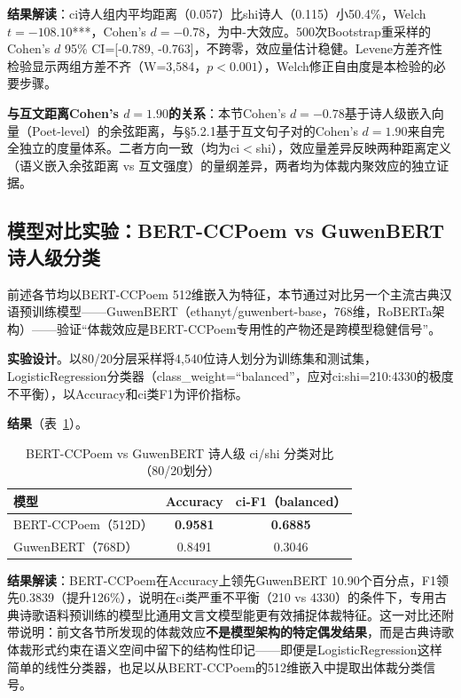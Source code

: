 \documentclass[12pt,a4paper]{article}
\numberwithin{equation}{section}
\begin{document}
\textbf{结果解读}：ci诗人组内平均距离（0.057）比shi诗人（0.115）小50.4\%，Welch $t=-108.10$***，Cohen's $d=-0.78$，为中-大效应。500次Bootstrap重采样的Cohen's $d$ 95\% CI=[-0.789, -0.763]，不跨零，效应量估计稳健。Levene方差齐性检验显示两组方差不齐（W=3{,}584，$p<0.001$），Welch修正自由度是本检验的必要步骤。

\textbf{与互文距离Cohen's $d=1.90$的关系}：本节Cohen's $d=-0.78$基于诗人级嵌入向量（Poet-level）的余弦距离，与§5.2.1基于互文句子对的Cohen's $d=1.90$来自完全独立的度量体系。二者方向一致（均为ci$<$shi），效应量差异反映两种距离定义（语义嵌入余弦距离 vs 互文强度）的量纲差异，两者均为体裁内聚效应的独立证据。

\subsection{模型对比实验：BERT-CCPoem vs GuwenBERT 诗人级分类}\label{sec:guwenbert}
\label{sec:exp-model-comparison}

前述各节均以BERT-CCPoem 512维嵌入为特征，本节通过对比另一个主流古典汉语预训练模型——GuwenBERT（ethanyt/guwenbert-base，768维，RoBERTa架构）——验证“体裁效应是BERT-CCPoem专用性的产物还是跨模型稳健信号”。

\textbf{实验设计}。以80/20分层采样将4,540位诗人划分为训练集和测试集，LogisticRegression分类器（class\_weight=“balanced”，应对ci:shi=210:4330的极度不平衡），以Accuracy和ci类F1为评价指标。

\textbf{结果}（表~\ref{tab:model-comparison}）。

\begin{table}[htbp]
  \centering
  \caption{BERT-CCPoem vs GuwenBERT 诗人级 ci/shi 分类对比（80/20划分）}
  \label{tab:model-comparison}
  \begin{tabular}{lcc}
    \toprule
    模型              & Accuracy & ci-F1（balanced） \\
    \midrule
    BERT-CCPoem（512D） & \textbf{0.9581} & \textbf{0.6885} \\
    GuwenBERT（768D）   & 0.8491          & 0.3046          \\
    \bottomrule
  \end{tabular}
\end{table}

\textbf{结果解读}：BERT-CCPoem在Accuracy上领先GuwenBERT 10.90个百分点，F1领先0.3839（提升126\%），说明在ci类严重不平衡（210 vs 4330）的条件下，专用古典诗歌语料预训练的模型比通用文言文模型能更有效捕捉体裁特征。这一对比还附带说明：前文各节所发现的体裁效应\textbf{不是模型架构的特定偶发结果}，而是古典诗歌体裁形式约束在语义空间中留下的结构性印记——即便是LogisticRegression这样简单的线性分类器，也足以从BERT-CCPoem的512维嵌入中提取出体裁分类信号。
\end{document}
